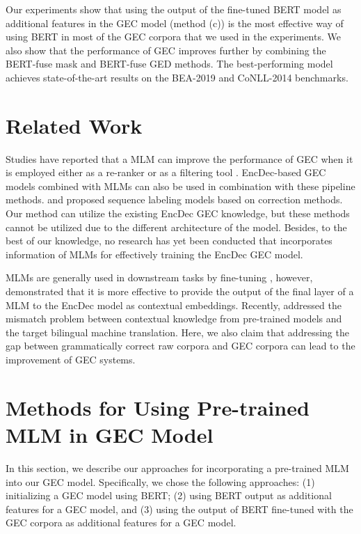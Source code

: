 \documentclass[11pt,a4paper]{article}
\begin{document}
Our experiments show that using the output of the fine-tuned BERT model as additional features in the GEC model (method (c)) is the most effective way of using BERT in most of the GEC corpora that we used in the experiments.
We also show that the performance of GEC improves further by combining the BERT-fuse mask and BERT-fuse GED methods.
The best-performing model achieves state-of-the-art results on the BEA-2019 and CoNLL-2014 benchmarks.


\section{Related Work}

Studies have reported that a MLM can improve the performance of GEC when it is employed either as a re-ranker \cite{chollampatt2019csgec, kaneko-etal-2019-tmu} or as a filtering tool \cite{asano-etal-2019-aip, kiyono-etal-2019-empirical}.
EncDec-based GEC models combined with MLMs can also be used in combination with these pipeline methods.
\citet{kantor-etal-2019-learning} and \citet{awasthi-etal-2019-parallel} proposed sequence labeling models based on correction methods.
Our method can utilize the existing EncDec GEC knowledge, but these methods cannot be utilized due to the different architecture of the model.
Besides, to the best of our knowledge, no research has yet been conducted that incorporates information of MLMs for effectively training the EncDec GEC model.

MLMs are generally used in downstream tasks by fine-tuning \cite{liu2019fine, zhang2019pretraining}, however, \citet{Zhu2020IncorporatingBI} demonstrated that it is more effective to provide the output of the final layer of a MLM to the EncDec model as contextual embeddings.
Recently, \citet{weng2019acquiring} addressed the mismatch problem between contextual knowledge from pre-trained models and the target bilingual machine translation.
Here, we also claim that addressing the gap between grammatically correct raw corpora and GEC corpora can lead to the improvement of GEC systems. 

\section{Methods for Using Pre-trained MLM in GEC Model}
In this section, we describe our approaches for incorporating a pre-trained MLM into our GEC model.
Specifically, we chose the following approaches: 
(1) initializing a GEC model using BERT; 
(2) using BERT output as additional features for a GEC model, and 
(3) using the output of BERT fine-tuned with the GEC corpora as additional features for a GEC model.
\end{document}

